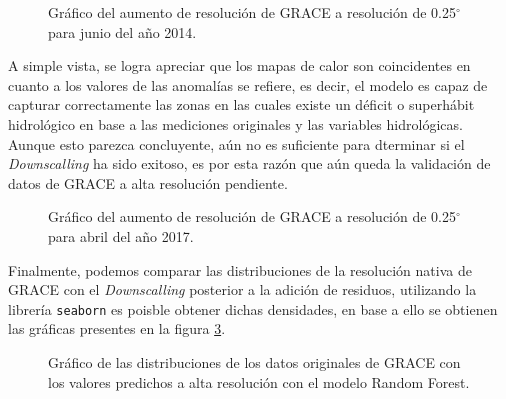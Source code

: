 \begin{figure}[H]
    \centering
          \goodgap
          \vskip -0.1in
    \caption[\textit{Downscalling} final para el mes 06/2014]{Gráfico del aumento de resolución de GRACE a resolución de 0.25$^{\circ}$ para junio del año 2014.}
    \label{dsf14}
\end{figure}

A simple vista, se logra apreciar que los mapas de calor son coincidentes en cuanto a los valores de las anomalías se refiere, es decir, el modelo es capaz de capturar correctamente
las zonas en las cuales existe un déficit o superhábit hidrológico en base a las mediciones originales y las variables hidrológicas. Aunque esto parezca concluyente, aún no es suficiente para dterminar si el \textit{Downscalling}
ha sido exitoso, es por esta razón que aún queda la validación de datos de GRACE a alta resolución pendiente.

\begin{figure}[H]
    \centering
          \goodgap
          \vskip -0.1in
    \caption[\textit{Downscalling} final para el mes 06/2014]{Gráfico del aumento de resolución de GRACE a resolución de 0.25$^{\circ}$ para abril del año 2017.}
    \label{dsf17}
\end{figure}



Finalmente, podemos comparar las distribuciones de la resolución nativa de GRACE con el \textit{Downscalling} posterior a la adición de residuos,
utilizando la librería \texttt{seaborn} es poisble obtener dichas densidades, en base a ello se obtienen las gráficas presentes en la figura \ref{distcomp}.
\begin{figure}[H]
    \centering
          \goodgap
          \vskip -0.1in
    \caption[Comparativa de distribuciones de GRACE]{Gráfico de las distribuciones de los datos originales de GRACE con los valores predichos a alta resolución con el modelo Random Forest.}
    \label{distcomp}
\end{figure}

